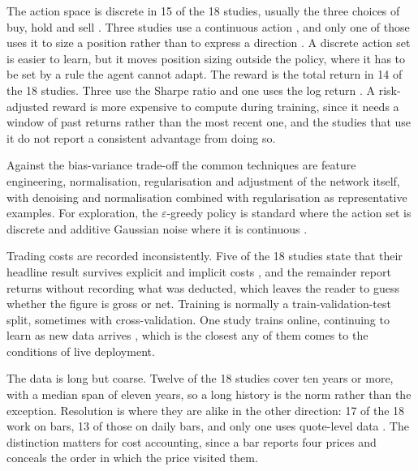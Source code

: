The action space is discrete in 15 of the 18 studies, usually the three choices of buy, hold and sell \cite{rundo_deep_2019, saini_stock_2019, xiong_practical_2018}. Three studies use a continuous action \cite{majidi_algorithmic_2022, jia_lstm-ddpg_2021, zhang_deep_2020}, and only one of those uses it to size a position rather than to express a direction \cite{jia_lstm-ddpg_2021}. A discrete action set is easier to learn, but it moves position sizing outside the policy, where it has to be set by a rule the agent cannot adapt. The reward is the total return in 14 of the 18 studies. Three use the Sharpe ratio \cite{kong_empirical_2023, sagiraju_application_2021, jia_lstm-ddpg_2021} and one uses the log return \cite{majidi_algorithmic_2022}. A risk-adjusted reward is more expensive to compute during training, since it needs a window of past returns rather than the most recent one, and the studies that use it do not report a consistent advantage from doing so.

Against the bias-variance trade-off the common techniques are feature engineering, normalisation, regularisation and adjustment of the network itself, with denoising \cite{li_deep_2019} and normalisation combined with regularisation \cite{theate_application_2021} as representative examples. For exploration, the \(\varepsilon\)-greedy policy is standard where the action set is discrete and additive Gaussian noise where it is continuous \cite{wu_adaptive_2020, majidi_algorithmic_2022}.

Trading costs are recorded inconsistently. Five of the 18 studies state that their headline result survives explicit and implicit costs \cite{huang_financial_2018, gran_deep_2019, yang_deep_2020, jia_lstm-ddpg_2021, zhang_deep_2020}, and the remainder report returns without recording what was deducted, which leaves the reader to guess whether the figure is gross or net. Training is normally a train-validation-test split, sometimes with cross-validation. One study trains online, continuing to learn as new data arrives \cite{huang_financial_2018}, which is the closest any of them comes to the conditions of live deployment.

The data is long but coarse. Twelve of the 18 studies cover ten years or more, with a median span of eleven years, so a long history is the norm rather than the exception. Resolution is where they are alike in the other direction: 17 of the 18 work on bars, 13 of those on daily bars, and only one uses quote-level data \cite{carapuco_reinforcement_2018}. The distinction matters for cost accounting, since a bar reports four prices and conceals the order in which the price visited them.